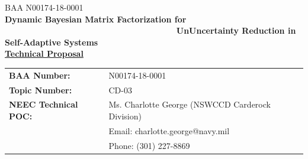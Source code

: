 \documentclass[12pt]{article}
\newcommand{\CallNumber}{BAA N00174-18-0001}
\newcommand{\CallName}{XXXX}
\begin{document}
\begin{titlepage}

\newcommand{\HRule}{\rule{\linewidth}{0.3mm}} %




\noindent\large \CallNumber\\[.20cm] %

\noindent \LARGE \textbf{Dynamic Bayesian Matrix Factorization for~~~~~~~~~~~~~                   ~~~~          ~~~~~~~~~~~~    ~~~~~~~~~~~~~       ~~~~~    ~~~~UnUncertainty Reduction in Self-Adaptive Systems}\\[.10cm] %


\noindent \large  \underline{\textbf{Technical Proposal}}\\ [.15cm] 

\begin{tabular}{ L{50mm} L{100mm} }



\normalsize \textbf{BAA Number:} & \normalsize  N00174-18-0001  \\



\normalsize \textbf{Topic Number:} & \normalsize  CD-03  \\ 
\normalsize \textbf{NEEC Technical POC:} & \normalsize  Ms. Charlotte George (NSWCCD Carderock Division)  \\
 & \normalsize  Email: charlotte.george@navy.mil  \\
 & \normalsize  Phone: (301) 227-8869  \\



\end{tabular}
\end{titlepage}
\end{document}
